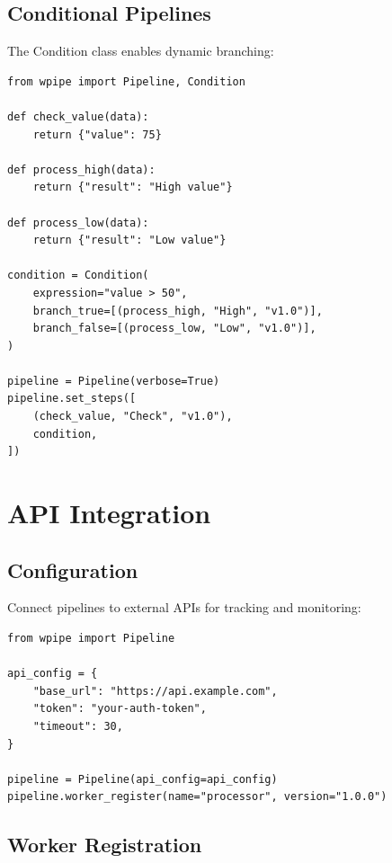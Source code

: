 \documentclass[12pt,a4paper]{report}
\begin{document}
\section{Conditional Pipelines}

The Condition class enables dynamic branching:

\begin{lstlisting}[caption={Conditional Pipeline}, label={lst:condition}]
from wpipe import Pipeline, Condition

def check_value(data):
    return {"value": 75}

def process_high(data):
    return {"result": "High value"}

def process_low(data):
    return {"result": "Low value"}

condition = Condition(
    expression="value > 50",
    branch_true=[(process_high, "High", "v1.0")],
    branch_false=[(process_low, "Low", "v1.0")],
)

pipeline = Pipeline(verbose=True)
pipeline.set_steps([
    (check_value, "Check", "v1.0"),
    condition,
])
\end{lstlisting}

\chapter{API Integration}
\cleardoublepage

\section{Configuration}

Connect pipelines to external APIs for tracking and monitoring:

\begin{lstlisting}[caption={API Configuration}, label={lst:api-config}]
from wpipe import Pipeline

api_config = {
    "base_url": "https://api.example.com",
    "token": "your-auth-token",
    "timeout": 30,
}

pipeline = Pipeline(api_config=api_config)
pipeline.worker_register(name="processor", version="1.0.0")
\end{lstlisting}

\section{Worker Registration}
\end{document}
